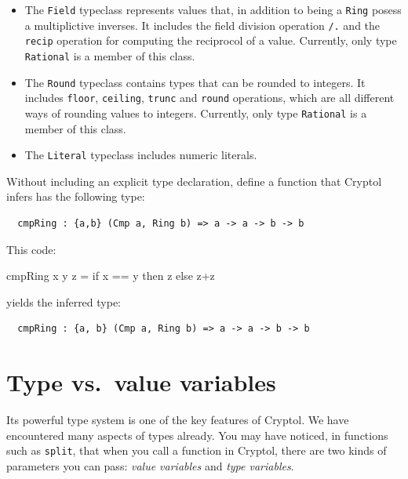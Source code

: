 \begin{itemize}
\item
The \texttt{Field} typeclass represents values that, in addition to
being a \texttt{Ring} posess a multiplictive inverses.
It includes the field division operation \texttt{/.} and the
\texttt{recip} operation for computing the reciprocol of a value.
Currently, only type \texttt{Rational} is a member of this class.

\item
 The \texttt{Round} typeclass contains types that can be
 rounded to integers.  It includes \texttt{floor}, \texttt{ceiling},
 \texttt{trunc} and \texttt{round} operations, which are all different
 ways of rounding values to integers.
Currently, only type \texttt{Rational} is a member of this class.

\item
The \texttt{Literal} typeclass includes numeric literals.
\end{itemize}

\begin{Exercise}\label{ex:tvar:1}
  Without including an explicit type declaration, define a function
  that Cryptol infers has the following type:
\begin{Verbatim}
  cmpRing : {a,b} (Cmp a, Ring b) => a -> a -> b -> b
\end{Verbatim}
\end{Exercise}
\begin{Answer}
This code:
\begin{code}
  cmpRing x y z = if x == y then z else z+z
\end{code}
yields the inferred type:
\begin{Verbatim}
  cmpRing : {a, b} (Cmp a, Ring b) => a -> a -> b -> b
\end{Verbatim}
\end{Answer}

\section{Type vs.\ value variables}\indTypeVariables
\label{sec:type-vs.-value}


Its powerful type system is one of the key features of Cryptol. We
have encountered many aspects of types already. You may have noticed,
in functions such as \texttt{split}, that when you call a function in
Cryptol, there are two kinds of parameters you can pass: \textit{value
  variables} and \textit{type variables}.

